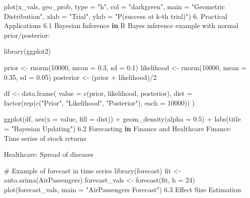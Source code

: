 \documentclass[
  letterpaper,
  DIV=11,
  numbers=noendperiod]{scrreprt}
\newenvironment{Shaded}{\begin{snugshade}}{\end{snugshade}}
\newcommand{\AttributeTok}[1]{\textcolor[rgb]{0.40,0.45,0.13}{#1}}
\newcommand{\CommentTok}[1]{\textcolor[rgb]{0.37,0.37,0.37}{#1}}
\newcommand{\ControlFlowTok}[1]{\textcolor[rgb]{0.00,0.23,0.31}{\textbf{#1}}}
\newcommand{\DecValTok}[1]{\textcolor[rgb]{0.68,0.00,0.00}{#1}}
\newcommand{\FloatTok}[1]{\textcolor[rgb]{0.68,0.00,0.00}{#1}}
\newcommand{\FunctionTok}[1]{\textcolor[rgb]{0.28,0.35,0.67}{#1}}
\newcommand{\NormalTok}[1]{\textcolor[rgb]{0.00,0.23,0.31}{#1}}
\newcommand{\OtherTok}[1]{\textcolor[rgb]{0.00,0.23,0.31}{#1}}
\newcommand{\SpecialCharTok}[1]{\textcolor[rgb]{0.37,0.37,0.37}{#1}}
\newcommand{\StringTok}[1]{\textcolor[rgb]{0.13,0.47,0.30}{#1}}
\begin{document}
{\begin{Shaded}
\begin{Highlighting}[]
\FunctionTok{plot}\NormalTok{(x\_vals, geo\_prob, }\AttributeTok{type =} \StringTok{"h"}\NormalTok{, }\AttributeTok{col =} \StringTok{"darkgreen"}\NormalTok{,}
     \AttributeTok{main =} \StringTok{"Geometric Distribution"}\NormalTok{,}
     \AttributeTok{xlab =} \StringTok{"Trial"}\NormalTok{, }\AttributeTok{ylab =} \StringTok{"P(success at k{-}th trial)"}\NormalTok{)}
\FloatTok{6.}\NormalTok{ Practical Applications}
\FloatTok{6.1}\NormalTok{ Bayesian Inference }\ControlFlowTok{in}\NormalTok{ R}
\NormalTok{Bayes inference example with normal prior}\SpecialCharTok{/}\NormalTok{posterior}\SpecialCharTok{:}

\FunctionTok{library}\NormalTok{(ggplot2)}

\NormalTok{prior }\OtherTok{\textless{}{-}} \FunctionTok{rnorm}\NormalTok{(}\DecValTok{10000}\NormalTok{, }\AttributeTok{mean =} \FloatTok{0.3}\NormalTok{, }\AttributeTok{sd =} \FloatTok{0.1}\NormalTok{)}
\NormalTok{likelihood }\OtherTok{\textless{}{-}} \FunctionTok{rnorm}\NormalTok{(}\DecValTok{10000}\NormalTok{, }\AttributeTok{mean =} \FloatTok{0.35}\NormalTok{, }\AttributeTok{sd =} \FloatTok{0.05}\NormalTok{)}
\NormalTok{posterior }\OtherTok{\textless{}{-}}\NormalTok{ (prior }\SpecialCharTok{+}\NormalTok{ likelihood)}\SpecialCharTok{/}\DecValTok{2}

\NormalTok{df }\OtherTok{\textless{}{-}} \FunctionTok{data.frame}\NormalTok{(}
  \AttributeTok{value =} \FunctionTok{c}\NormalTok{(prior, likelihood, posterior),}
  \AttributeTok{dist =} \FunctionTok{factor}\NormalTok{(}\FunctionTok{rep}\NormalTok{(}\FunctionTok{c}\NormalTok{(}\StringTok{"Prior"}\NormalTok{, }\StringTok{"Likelihood"}\NormalTok{, }\StringTok{"Posterior"}\NormalTok{), }\AttributeTok{each =} \DecValTok{10000}\NormalTok{))}
\NormalTok{)}

\FunctionTok{ggplot}\NormalTok{(df, }\FunctionTok{aes}\NormalTok{(}\AttributeTok{x =}\NormalTok{ value, }\AttributeTok{fill =}\NormalTok{ dist)) }\SpecialCharTok{+}
  \FunctionTok{geom\_density}\NormalTok{(}\AttributeTok{alpha =} \FloatTok{0.5}\NormalTok{) }\SpecialCharTok{+}
  \FunctionTok{labs}\NormalTok{(}\AttributeTok{title =} \StringTok{"Bayesian Updating"}\NormalTok{)}
\FloatTok{6.2}\NormalTok{ Forecasting }\ControlFlowTok{in}\NormalTok{ Finance and Healthcare}
\NormalTok{Finance}\SpecialCharTok{:}\NormalTok{ Time series of stock returns}

\NormalTok{Healthcare}\SpecialCharTok{:}\NormalTok{ Spread of diseases}

\CommentTok{\# Example of forecast in time series}
\FunctionTok{library}\NormalTok{(forecast)}
\NormalTok{fit }\OtherTok{\textless{}{-}} \FunctionTok{auto.arima}\NormalTok{(AirPassengers)}
\NormalTok{forecast\_vals }\OtherTok{\textless{}{-}} \FunctionTok{forecast}\NormalTok{(fit, }\AttributeTok{h =} \DecValTok{24}\NormalTok{)}
\FunctionTok{plot}\NormalTok{(forecast\_vals, }\AttributeTok{main =} \StringTok{"AirPassengers Forecast"}\NormalTok{)}
\FloatTok{6.3}\NormalTok{ Effect Size Estimation}


\end{Highlighting}
\end{Shaded}}
\end{document}
